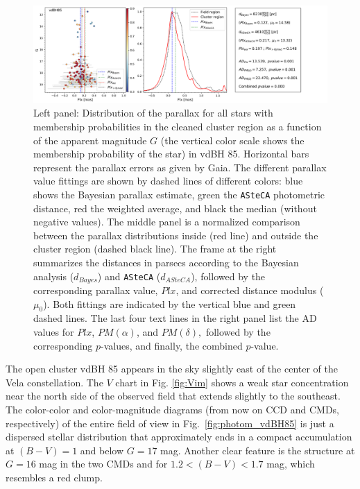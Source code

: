 \documentclass[draft]{aa}
\begin{document}
\begin{figure}[ht]
    \centering
    \includegraphics[width=\hsize]{../figs/plx_vdBH85.png}
\caption{Left panel: Distribution of the parallax for all stars with membership
probabilities in the cleaned cluster region as a function of the apparent
magnitude $G$ (the vertical color scale shows the membership
probability of the star) in vdBH 85.
Horizontal bars represent the parallax errors as given by Gaia. The different
parallax value fittings are shown by dashed lines of different colors:
blue shows the Bayesian parallax estimate, green the \texttt{ASteCA}
photometric distance, red the weighted average, and black the median 
(without negative values).
The middle panel is a normalized comparison between the parallax
distributions inside (red line) and outside the cluster region (dashed
black line). The frame at the right summarizes the distances in parsecs
according to the Bayesian analysis ($d_{Bayes}$) and \texttt{ASteCA} ($d_
{ASteCA}$), followed by the corresponding parallax value, $Plx$, and
corrected distance modulus ($\mu_0$). Both fittings are indicated by the
vertical blue and green dashed lines. The last four text lines in the right
panel list the AD values for $Plx$, $PM(\alpha)$, and $PM(\delta),$ followed by
the corresponding $p$-values, and finally, the combined $p$-value.
}
    \label{fig:plx_bys_vdBH85}
\end{figure}

The open cluster vdBH 85 appears in the sky slightly east of the center of the
Vela constellation. The $V$ chart in Fig. \ref{fig:Vim} shows a weak star
concentration near the north side of the observed field that extends slightly
to the southeast. 
%
The color-color and color-magnitude diagrams (from now on CCD and CMDs,
respectively) of the entire field of view in Fig.~\ref{fig:photom_vdBH85} is
just a dispersed stellar distribution that approximately ends in a compact accumulation at
$(B-V)=1$ and below $G=17$ mag. Another clear feature is the
structure at $G=16$ mag in the two CMDs and for $1.2<(B-V)<1.7$ mag, which resembles
a red clump.\\
\end{document}
